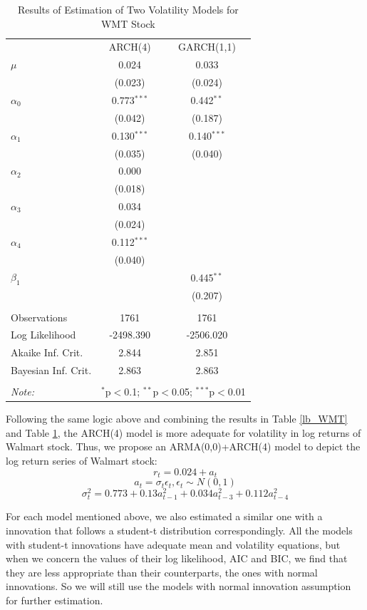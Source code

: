 \documentclass[paper=a4, fontsize=11pt]{article}
\begin{document}
\begin{table}[!htbp] \centering 
  \caption{Results of Estimation of Two Volatility Models for WMT Stock} 
  \label{est_WMT} 
\begin{tabular}{@{\extracolsep{5pt}}lcc} 
\\[-1.8ex]\hline 
\hline
 & ARCH(4) & GARCH(1,1) \\ 
  $\mu$ & 0.024 & 0.033 \\ 
  & (0.023) & (0.024) \\ 
 $\alpha_0$ & 0.773$^{***}$ & 0.442$^{**}$ \\ 
  & (0.042) & (0.187) \\ 
 $\alpha_1$ & 0.130$^{***}$ & 0.140$^{***}$ \\ 
  & (0.035) & (0.040) \\ 
 $\alpha_2$ & 0.000 &  \\ 
  & (0.018) &  \\ 
 $\alpha_3$ & 0.034 &  \\ 
  & (0.024) &  \\ 
 $\alpha_4$ & 0.112$^{***}$ &  \\ 
  & (0.040) &  \\ 
 $\beta_1$ &  & 0.445$^{**}$ \\ 
  &  & (0.207) \\ 
\hline \\[-1.8ex] 
Observations & 1761 & 1761 \\ 
Log Likelihood & -2498.390 & -2506.020 \\ 
Akaike Inf. Crit. & 2.844 & 2.851 \\ 
Bayesian Inf. Crit. & 2.863 & 2.863 \\ 
\hline 
\hline \\[-1.8ex] 
\textit{Note:}  & \multicolumn{2}{r}{$^{*}$p$<$0.1; $^{**}$p$<$0.05; $^{***}$p$<$0.01} \\ 
\end{tabular} 
\end{table} 

Following the same logic above and combining the results in Table \ref{lb_WMT} and Table \ref{est_WMT}, the ARCH(4) model is more adequate for volatility in log returns of Walmart stock. Thus, we propose an ARMA(0,0)+ARCH(4) model to depict the log return series of Walmart stock:
\[ r_t = 0.024+a_t\]
\[ a_t = \sigma_t \epsilon_t, \epsilon_t \sim N(0,1) \]
\[ \sigma_t^2 = 0.773+0.13a_{t-1}^2+0.034a_{t-3}^2+0.112a_{t-4}^2 \]

For each model mentioned above, we also estimated a similar one with a innovation that follows a student-t distribution correspondingly. All the models with student-t innovations have adequate mean and volatility equations, but when we concern the values of their log likelihood, AIC and BIC, we find that they are less appropriate than their counterparts, the ones with normal innovations. So we will still use the models with normal innovation assumption for further estimation. 
\end{document}
